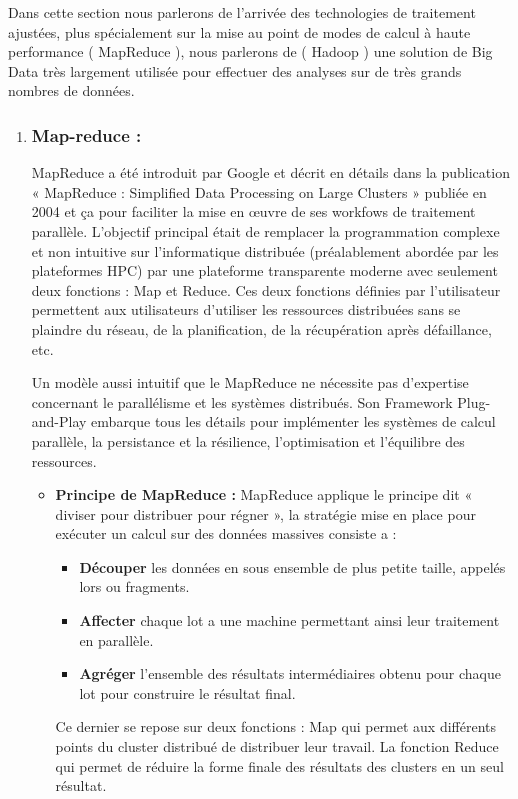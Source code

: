 Dans cette section nous parlerons de l'arrivée des technologies de traitement ajustées, plus spécialement sur la mise au point de modes de calcul à haute performance ( MapReduce ), nous parlerons de ( Hadoop ) une solution de Big Data très largement utilisée pour effectuer des analyses sur de très grands nombres de données.

\begin{enumerate}[label=\protect\ding{\value*}, start=182,font=\color{blue}]
\item \subsubsection{Map-reduce :}
MapReduce a été introduit par Google et décrit en détails dans la publication « MapReduce : Simplified Data Processing on Large Clusters » publiée en 2004 et ça pour faciliter la mise en œuvre de ses workfows de traitement parallèle. L'objectif principal était de remplacer la programmation complexe et non intuitive sur l'informatique distribuée (préalablement abordée par les plateformes HPC) par une plateforme transparente moderne avec seulement deux fonctions : Map et Reduce. Ces deux fonctions définies par l'utilisateur permettent aux utilisateurs d'utiliser les ressources distribuées sans se plaindre du réseau, de la planification, de la récupération après défaillance, etc.

Un modèle aussi intuitif que le MapReduce ne nécessite pas d'expertise concernant le parallélisme et les systèmes distribués. Son Framework Plug-and-Play embarque tous les détails pour implémenter les systèmes de calcul parallèle, la persistance et la résilience, l'optimisation et l'équilibre des ressources.

\begin{itemize}[label=]
\item \textbf{Principe de MapReduce :}
MapReduce applique le principe dit « diviser pour distribuer pour régner », la stratégie mise en place pour exécuter un calcul sur des données massives consiste a : 
\begin{itemize}[label=\textbullet]
\item \textbf{Découper} les données en sous ensemble de plus petite taille, appelés lors ou fragments.
\item \textbf{Affecter} chaque lot a une machine permettant ainsi leur traitement en parallèle.
\item \textbf{Agréger} l'ensemble des résultats intermédiaires obtenu pour chaque lot pour construire le résultat final.
\end{itemize}
\newpage
Ce dernier se repose sur deux fonctions : Map qui permet aux différents points du cluster distribué de distribuer leur travail. La fonction Reduce qui permet de réduire la forme finale des résultats des clusters en un seul résultat.


\end{itemize}
\end{enumerate}
